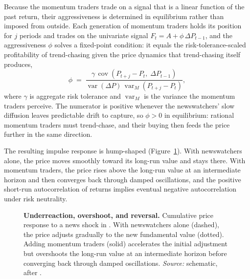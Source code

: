 Because the momentum traders trade on a signal that is a linear function of the past return, their aggressiveness is determined in equilibrium rather than imposed from outside. Each generation of momentum traders holds its position for $j$ periods and trades on the univariate signal $F_t = A + \phi\,\Delta P_{t-1}$, and the aggressiveness $\phi$ solves a fixed-point condition: it equals the risk-tolerance-scaled profitability of trend-chasing given the price dynamics that trend-chasing itself produces,
\[
\phi \;=\; \frac{\gamma\,\operatorname{cov}\!\left(P_{t+j}-P_t,\;\Delta P_{t-1}\right)}{\operatorname{var}(\Delta P)\,\operatorname{var}_{M}\!\left(P_{t+j}-P_t\right)},
\]
where $\gamma$ is aggregate risk tolerance and $\operatorname{var}_{M}$ is the variance the momentum traders perceive. The numerator is positive whenever the newswatchers' slow diffusion leaves predictable drift to capture, so $\phi > 0$ in equilibrium: rational momentum traders must trend-chase, and their buying then feeds the price further in the same direction.

The resulting impulse response is hump-shaped (Figure~\ref{fig:hsir}). With newswatchers alone, the price moves smoothly toward its long-run value and stays there. With momentum traders, the price rises above the long-run value at an intermediate horizon and then converges back through damped oscillations, and the positive short-run autocorrelation of returns implies eventual negative autocorrelation under risk neutrality.

\begin{figure}[htbp]
\centering
{}
\caption[Hump-shaped impulse response in the Hong--Stein model]{\textbf{Underreaction, overshoot, and reversal.} Cumulative price response to a news shock in \citet{hong1999}. With newswatchers alone (dashed), the price adjusts gradually to the new fundamental value (dotted). Adding momentum traders (solid) accelerates the initial adjustment but overshoots the long-run value at an intermediate horizon before converging back through damped oscillations. \textit{Source:} schematic, after \citet{hong1999}.}
\label{fig:hsir}
\end{figure}

